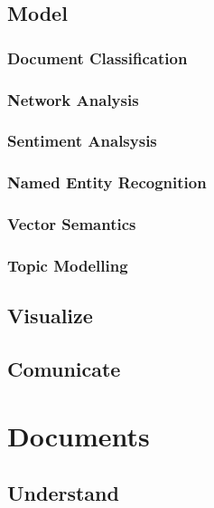 \documentclass[]{book}
\theoremstyle{definition}
\theoremstyle{definition}
\theoremstyle{definition}
\theoremstyle{remark}
\begin{document}
\subsection{Model}\label{sotatoolsmodel}

\subsubsection{Document Classification}\label{sotatoolsmodeldocclass}

\subsubsection{Network Analysis}\label{sotatoolsmodelnetanal}

\subsubsection{Sentiment Analsysis}\label{sotatoolsmodelsentanal}

\subsubsection{Named Entity Recognition}\label{sotatoolsmodelner}

\subsubsection{Vector Semantics}\label{sotatoolsmodelvec}

\subsubsection{Topic Modelling}\label{sotatoolsmodeltopicmodel}

\subsection{Visualize}\label{sotatoolsvisualize}

\subsection{Comunicate}\label{sotatoolscomunicate}

\section{Documents}\label{sotadocuments}

\subsection{Understand}\label{sotadocumentsunderstand}
\end{document}
